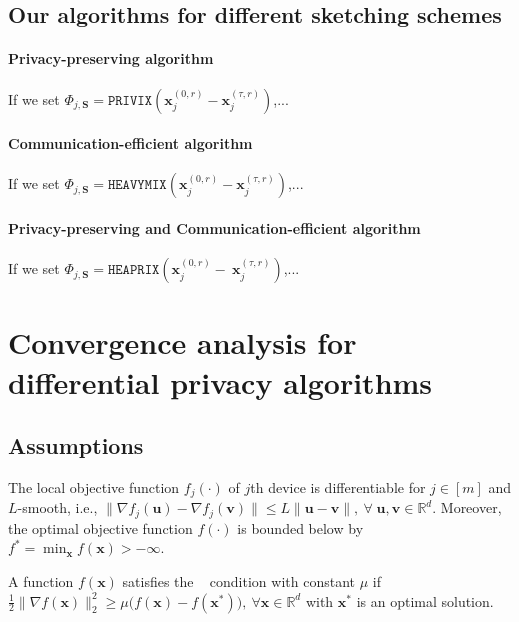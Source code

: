 \subsection{Our algorithms for different sketching schemes}
\paragraph{Privacy-preserving algorithm}
If we set  $\Phi_{j,\mathbf{S}}=\texttt{PRIVIX}\left(\boldsymbol{x}_j^{(0,r)}-\boldsymbol{x}_j^{(\tau,r)}\right)$,...

\paragraph{Communication-efficient algorithm}
If we set  $\Phi_{j,\mathbf{S}}=\texttt{HEAVYMIX}\left(\boldsymbol{x}_j^{(0,r)}-\boldsymbol{x}_j^{(\tau,r)}\right)$,...
\paragraph{Privacy-preserving and Communication-efficient algorithm}
If we set  $\Phi_{j,\mathbf{S}}=\texttt{HEAPRIX}\left(\boldsymbol{x}_j^{(0,r)}-~{\boldsymbol{x}}_{j}^{(\tau,r)}\right)$,...







\section{Convergence analysis for differential privacy algorithms}

\subsection{Assumptions}


\begin{assumption}\label{Assu:1}
The local objective function $f_j(\cdot)$ of $j$th device is differentiable for $j\in [m]$ and $L$-smooth, i.e., $\|\nabla f_j(\boldsymbol{u})-\nabla f_j(\mathbf{v})\|\leq L\|\boldsymbol{u}-\mathbf{v}\|,\: \forall \;\boldsymbol{u},\mathbf{v}\in\mathbb{R}^d$. Moreover, the optimal objective function $f(\cdot)$ is bounded below by ${f^*} = \min_{\boldsymbol{x}} f(\boldsymbol{x})>-\infty$. 
\end{assumption}

\begin{assumption}[\pl]\label{assum:pl}
A function $f(\boldsymbol{x})$ satisfies the \pl~ condition with constant $\mu$ if $\frac{1}{2}\|\nabla f(\boldsymbol{x})\|_2^2\geq \mu\big(f(\boldsymbol{x})-f(\boldsymbol{x}^*)\big),\: \forall \boldsymbol{x}\in\mathbb{R}^d $ with $\boldsymbol{x}^*$ is an optimal solution.
\end{assumption}


